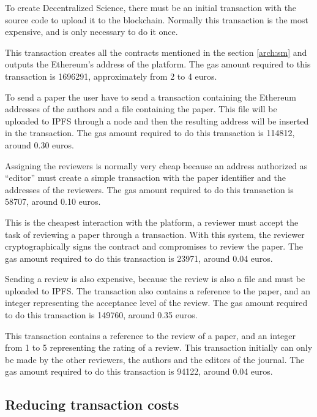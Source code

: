\begin{itemize}
   To create Decentralized Science, there must be an
  initial transaction with the source code to upload it to the blockchain.
  Normally this transaction is the most expensive, and is only necessary to do
  it once.

  This transaction creates all the contracts mentioned in the section
  \ref{arch:sm} and outputs the Ethereum's address of the platform. The gas
  amount required to this transaction is 1696291, approximately from 2 to 4
  euros.

   To send a paper the user have to send a transaction
  containing the Ethereum addresses of the authors and a file containing the
  paper. This file will be uploaded to IPFS through a node and then the
  resulting address will be inserted in the transaction. The gas amount required
  to do this transaction is 114812, around 0.30 euros.

   Assigning the reviewers is normally very cheap
  because an address authorized as ``editor'' must create a simple transaction
  with the paper identifier and the addresses of the reviewers. The gas amount
  required to do this transaction is 58707, around 0.10 euros.

   This is the cheapest interaction with the platform, a
  reviewer must accept the task of reviewing a paper through a transaction. With
  this system, the reviewer cryptographically signs the contract and compromises
  to review the paper. The gas amount required to do this transaction is 23971,
  around 0.04 euros.

   Sending a review is also expensive, because the review is
  also a file and must be uploaded to IPFS. The transaction also contains a
  reference to the paper, and an integer representing the acceptance level of
  the review. The gas amount required to do this transaction is 149760, around
  0.35 euros.

   This transaction contains a reference to the review of a
  paper, and an integer from 1 to 5 representing the rating of a review. This
  transaction initially can only be made by the other reviewers, the authors and
  the editors of the journal. The gas amount required to do this transaction is
  94122, around 0.04 euros.

\end{itemize}

\subsection{Reducing transaction costs}
\label{sec:reduc-trans-costs}

